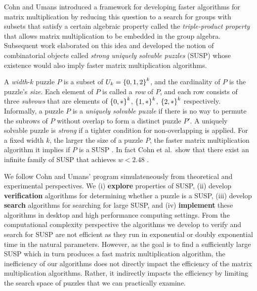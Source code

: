 \documentclass[11pt]{article}
\begin{document}


Cohn and Umans \cite{cu03} introduced a framework for developing
faster algorithms for matrix multiplication by reducing this question
to a search for groups with subsets that satisfy a certain algebraic
property called the \emph{triple-product property} that allows matrix
multiplication to be embedded in the group algebra.  Subsequent work
\cite{cksu05} elaborated on this idea and developed the notion of
combinatorial objects called \emph{strong uniquely solvable puzzles}
(SUSP) whose existence would also imply faster matrix multiplication
algorithms.

A \emph{width}-$k$ puzzle $P$ is a subset of $U_k = \left\{ 0,1,2 \right\}^k$,
and the cardinality of $P$ is the puzzle's \emph{size}.  Each element
of $P$ is called a \emph{row} of $P$, and each row consists of three
\emph{subrows} that are elements of $\left\{ 0,* \right\}^k$, $\left\{ 1,* \right\}^k$,
$\left\{ 2,* \right\}^k$ respectively.  Informally, a puzzle $P$ is a
\emph{uniquely solvable puzzle} if there is no way to permute the
subrows of $P$ without overlap to form a distinct puzzle $P'$.  A
uniquely solvable puzzle is \emph{strong} if a tighter condition for
non-overlapping is applied. For a fixed width $k$, the larger the size
of a puzzle $P$, the faster matrix multiplication algorithm it implies
if $P$ is a SUSP \cite[Corollary 3.6]{cksu05}.  In fact Cohn et
al.~show that there exist an infinite family of SUSP that achieves $w <
2.48$ \cite[Proposition 3.8]{cksu05}.


We follow Cohn and Umans' program simulateneously from theoretical and
experimental perspectives.  We (i) \textbf{explore} properties of SUSP, (ii)
develop \textbf{verification} algorithms for determining whether a
puzzle is a SUSP, (iii) develop \textbf{search} algorithms for searching
for large SUSP, and (iv) \textbf{implement} these algorithms in desktop and
high performance computing settings.  From the computational
complexity perspective the algorithms we develop to verify and search
for SUSP are not efficient as they run in exponential or doubly
exponential time in the natural parameters.  However, as the goal is
to find a sufficiently large SUSP which in turn produces a fast matrix
multiplication algorithm, the inefficiency of our algorithms does not
directly impact the efficiency of the matrix multiplication
algorithms.  Rather, it indirectly impacts the efficiency by limiting
the search space of puzzles that we can practically examine.
\end{document}
